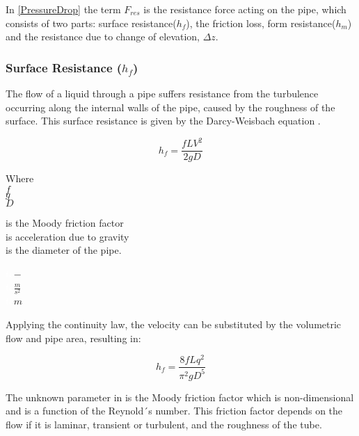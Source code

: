 In \eqref{PressureDrop} the term $F_{res}$ is the resistance force acting on the 
pipe, which consists of two parts: surface resistance($h_{f}$), the friction 
loss, form resistance($h_{m}$) and the resistance due to change of elevation, $\Delta z$. 

\subsubsection{Surface Resistance ($h_f$)} 
The flow of a liquid through a pipe suffers resistance from 
the turbulence occurring along the internal walls of the pipe, caused by the roughness of the surface. This surface resistance is given by the Darcy-Weisbach equation \cite{Design_Water}.

\begin{equation}
  h_f = \frac{fLV^2}{2gD}
  \label{Darcy}
\end{equation}

 \begin{minipage}[t]{0.20\textwidth}
Where\\
\hspace*{8mm} $f$ \\
\hspace*{8mm} $g$ \\
\hspace*{8mm} $D$ 
\end{minipage}
\begin{minipage}[t]{0.68\textwidth}
\vspace*{2mm}
is the Moody friction factor\\ 
is acceleration due to gravity\\
is the diameter of the pipe.
\end{minipage}
\begin{minipage}[t]{0.10\textwidth}
\vspace*{2mm}
\textcolor{White}{te}$\unit{-}$\\
\textcolor{White}{te}$\unit{\frac{m}{s^2}}$\\
\textcolor{White}{te}$\unit{m}$
\end{minipage}

Applying the continuity law, the velocity can be substituted by the volumetric flow and pipe area, resulting in:

\begin{equation}
  h_f = \frac{8fLq^2}{\pi^{2}gD^5}
  \label{DarcyWeisbach}
\end{equation} 
 
 The unknown parameter in  is the Moody friction factor 
 which is non-dimensional and is a function of the Reynold´s number. This friction factor depends on the flow if it is laminar, transient or turbulent, and the roughness of the tube. \\
 

